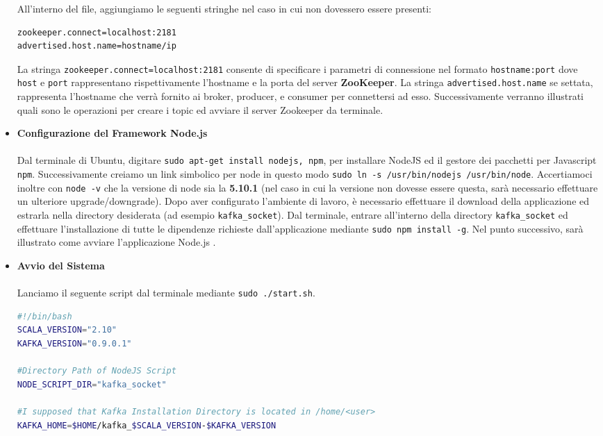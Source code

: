\documentclass[12pt]{article}
\begin{document}
\begin{itemize}
All'interno del file, aggiungiamo le seguenti stringhe nel caso in cui non dovessero essere presenti: 
\begin{lstlisting}[language=bash,caption=server.properties]
zookeeper.connect=localhost:2181
advertised.host.name=hostname/ip
\end{lstlisting}
La stringa \texttt{zookeeper.connect=localhost:2181} consente di specificare i parametri di connessione nel formato \texttt{hostname:port} dove \texttt{host} e \texttt{port} rappresentano rispettivamente l'hostname e la porta del server \textbf{ZooKeeper}. La stringa \texttt{advertised.host.name} se settata, rappresenta l'hostname che verrà fornito ai broker, producer, e consumer per connettersi ad esso.
Successivamente verranno illustrati quali sono le operazioni per creare i topic ed avviare il server Zookeeper da terminale.

\item {\textbf{Configurazione del Framework Node.js}}\\\\
Dal terminale di Ubuntu, digitare \texttt{sudo apt-get install nodejs, npm}, per installare NodeJS ed il gestore dei pacchetti per Javascript \texttt{npm}. Successivamente creiamo un link simbolico per node in questo modo \texttt{sudo ln -s /usr/bin/nodejs /usr/bin/node}. Accertiamoci inoltre con \texttt{node -v} che la versione di node sia la \textbf{5.10.1} (nel caso in cui la versione non dovesse essere questa, sarà necessario effettuare un ulteriore upgrade/downgrade).
Dopo aver configurato l'ambiente di lavoro, è necessario effettuare il download della applicazione ed estrarla nella directory desiderata (ad esempio \texttt{kafka\_socket}).
Dal terminale, entrare all'interno della directory \texttt{kafka\_socket} ed effettuare l'installazione di tutte le dipendenze richieste dall'applicazione mediante \texttt{sudo npm install -g}.
Nel punto successivo, sarà illustrato come avviare l'applicazione Node.js \cite{nodejs}.
\item {\textbf{Avvio del Sistema}}\\\\
Lanciamo il seguente script dal terminale mediante \texttt{sudo ./start.sh}.

\begin{lstlisting}[language=bash,caption=start.sh]
#!/bin/bash
SCALA_VERSION="2.10"
KAFKA_VERSION="0.9.0.1"

#Directory Path of NodeJS Script
NODE_SCRIPT_DIR="kafka_socket"

#I supposed that Kafka Installation Directory is located in /home/<user>
KAFKA_HOME=$HOME/kafka_$SCALA_VERSION-$KAFKA_VERSION


\end{lstlisting}
\end{itemize}
\end{document}
